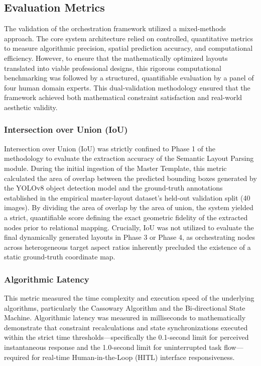 \begin{refsection}
\subsection{Evaluation Metrics}
The validation of the orchestration framework utilized a mixed-methods approach. The core system architecture relied on controlled, quantitative metrics to measure algorithmic precision, spatial prediction accuracy, and computational efficiency. However, to ensure that the mathematically optimized layouts translated into viable professional designs, this rigorous computational benchmarking was followed by a structured, quantifiable evaluation by a panel of four human domain experts. This dual-validation methodology ensured that the framework achieved both mathematical constraint satisfaction and real-world aesthetic validity.

\subsubsection{Intersection over Union (IoU)}
Intersection over Union (IoU) was strictly confined to Phase 1 of the methodology to evaluate the extraction accuracy of the Semantic Layout Parsing module. During the initial ingestion of the Master Template, this metric calculated the area of overlap between the predicted bounding boxes generated by the YOLOv8 object detection model and the ground-truth annotations established in the empirical master-layout dataset's held-out validation split (40 images). By dividing the area of overlap by the area of union, the system yielded a strict, quantifiable score defining the exact geometric fidelity of the extracted nodes prior to relational mapping. Crucially, IoU was not utilized to evaluate the final dynamically generated layouts in Phase 3 or Phase 4, as orchestrating nodes across heterogeneous target aspect ratios inherently precluded the existence of a static ground-truth coordinate map.

\subsubsection{Algorithmic Latency}
This metric measured the time complexity and execution speed of the underlying algorithms, particularly the Cassowary Algorithm and the Bi-directional State Machine. Algorithmic latency was measured in milliseconds to mathematically demonstrate that constraint recalculations and state synchronizations executed within the strict time thresholds—specifically the 0.1-second limit for perceived instantaneous response and the 1.0-second limit for uninterrupted task flow—required for real-time Human-in-the-Loop (HITL) interface responsiveness. \cite{nielsen1993usability}


\end{refsection}
